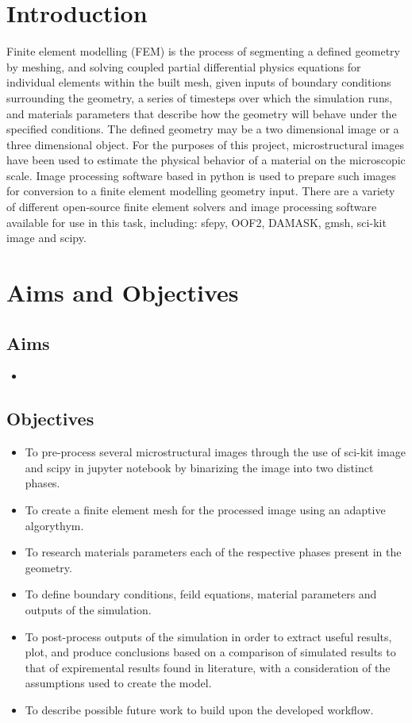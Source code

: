 \documentclass[\report.tex]{subfiles}
\begin{document}
\section{Introduction}
Finite element modelling (FEM) is the process of segmenting a defined geometry by meshing, and solving coupled partial differential physics equations for individual elements within the built mesh, given inputs of boundary conditions surrounding the geometry, a series of timesteps over which the simulation runs, and materials parameters that describe how the geometry will behave under the specified conditions. The defined geometry may be a two dimensional image or a three dimensional object. For the purposes of this project, microstructural images have been used to estimate the physical behavior of a material on the microscopic scale. Image processing software based in python is used to prepare such images for conversion to a finite element modelling geometry input. There are a variety of different open-source finite element solvers and image processing software available for use in this task, including: sfepy, OOF2, DAMASK, gmsh, sci-kit image and scipy.

\section{Aims and Objectives}
\subsection{Aims}

\begin{itemize}
  \item 
\end{itemize}

\subsection{Objectives}

\begin{itemize}
  \item To pre-process several microstructural images through the use of sci-kit image and scipy in jupyter notebook by binarizing the image into two distinct phases.
  \item To create a finite element mesh for the processed image using an adaptive algorythym.
  \item To research materials parameters each of the respective phases present in the geometry.
  \item To define boundary conditions, feild equations, material parameters and outputs of the simulation.
  \item To post-process outputs of the simulation in order to extract useful results, plot, and produce conclusions based on a comparison of simulated results to that of expiremental results found in literature, with a consideration of the assumptions used to create the model.
  \item To describe possible future work to build upon the developed workflow.
\end{itemize}
\end{document}
